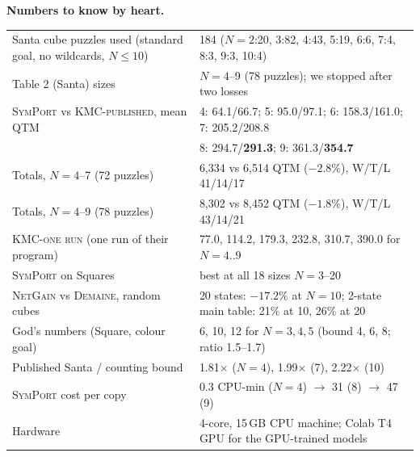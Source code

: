\documentclass[10.5pt,a4paper]{article}
\newcommand{\M}[1]{\textsc{#1}}
\begin{document}
\textbf{Numbers to know by heart.}
\begin{center}\small
\begin{tabularx}{\textwidth}{@{}>{\raggedright\arraybackslash}p{6.2cm}X@{}}
\toprule
Santa cube puzzles used (standard goal, no wildcards, $N\le10$) & 184 ($N{=}2$:20, 3:82, 4:43, 5:19, 6:6, 7:4, 8:3, 9:3, 10:4) \\
Table 2 (Santa) sizes & $N=4$--9 (78 puzzles); we stopped after two losses \\
\M{SymPort} vs \M{KMC-published}, mean QTM & 4: 64.1/66.7; 5: 95.0/97.1; 6: 158.3/161.0; 7: 205.2/208.8 \\
 & 8: 294.7/\textbf{291.3}; 9: 361.3/\textbf{354.7} \\
Totals, $N=4$--7 (72 puzzles) & 6,334 vs 6,514 QTM ($-2.8\%$), W/T/L 41/14/17 \\
Totals, $N=4$--9 (78 puzzles) & 8,302 vs 8,452 QTM ($-1.8\%$), W/T/L 43/14/21 \\
\M{KMC-one run} (one run of their program) & 77.0, 114.2, 179.3, 232.8, 310.7, 390.0 for $N=4..9$ \\
\M{SymPort} on Squares & best at all 18 sizes $N=3$--20 \\
\M{NetGain} vs \M{Demaine}, random cubes & 20 states: $-17.2\%$ at $N{=}10$; 2-state main table: 21\% at 10, 26\% at 20 \\
God's numbers (Square, colour goal) & 6, 10, 12 for $N=3,4,5$ (bound 4, 6, 8; ratio 1.5--1.7) \\
Published Santa / counting bound & 1.81$\times$ ($N{=}4$), 1.99$\times$ (7), 2.22$\times$ (10) \\
\M{SymPort} cost per copy & 0.3 CPU-min ($N{=}4$) $\to$ 31 (8) $\to$ 47 (9) \\
Hardware & 4-core, 15\,GB CPU machine; Colab T4 GPU for the GPU-trained models \\
\bottomrule
\end{tabularx}
\end{center}
\end{document}
